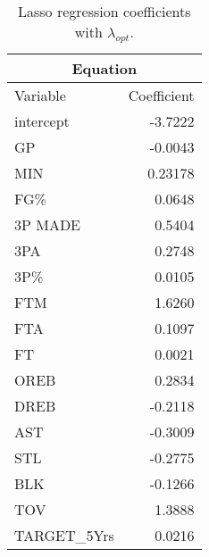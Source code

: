 \begin{table}[H]
	\centering
	\begin{tabular}{|| l | r ||} 
		\hline
		\multicolumn{2}{|c|}{Equation} \\
		\hline
		Variable & Coefficient \\
		\hline
		intercept & -3.7222 \\
		GP & -0.0043 \\
		MIN & 0.23178 \\
		FG\% & 0.0648 \\ 
		3P MADE & 0.5404 \\ 
		3PA & 0.2748 \\ 
		3P\% & 0.0105 \\
		FTM & 1.6260 \\ 
		FTA & 0.1097 \\ 
		FT & 0.0021 \\ 
		OREB & 0.2834 \\ 
		DREB & -0.2118 \\
		AST & -0.3009 \\
		STL & -0.2775 \\
		BLK & -0.1266 \\
		TOV & 1.3888 \\ 
		TARGET\_5Yrs & 0.0216 \\				
		\hline
	\end{tabular}
	\caption{Lasso regression coefficients with $\lambda_{opt}$.}
	\label{table:FinalLassoCoef}
\end{table}
